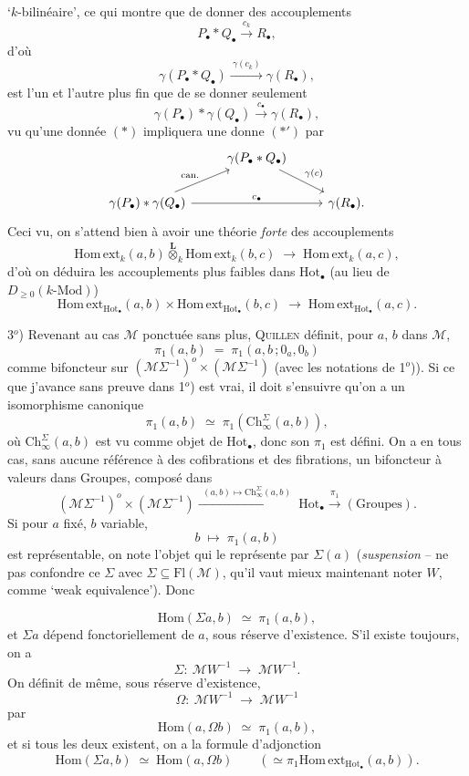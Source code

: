 \documentclass[11pt]{article}
\newcommand{\printedpage}[1]{\marginpar{\footnotesize p.~#1}}
\newcommand{\msp}[1]{\marginpar{\footnotesize [#1]}}
\newcommand{\Ch}{\mathrm{Ch}}
\newcommand{\Hot}{\mathrm{Hot}}
\newcommand{\M}{\mathcal{M}}
\newcommand{\Homext}{\mathrm{Hom\,ext}}
\newcommand{\Lotimes}{\overset{\mathbf{L}}{\otimes}}
\begin{document}
`$k$-bilinéaire', ce qui montre que de donner des accouplements
\[
P_{\bullet} * Q_{\bullet} \xrightarrow{\ c_k\ } R_{\bullet},
\]
d'où
\[
\gamma(P_{\bullet} * Q_{\bullet}) \xrightarrow{\ \gamma(c_k)\ } \gamma(R_{\bullet}), \tag*{$(*)$}
\]
est l'un et l'autre plus fin que de se donner seulement
\[
\gamma(P_{\bullet}) * \gamma(Q_{\bullet}) \xrightarrow{\ c_{\bullet}\ } \gamma(R_{\bullet}), \tag*{$(*')$}
\]
vu qu'une donnée $(*)$ impliquera une donne $(*')$ par %
\[
\begin{tikzcd}
 & \gamma(P_{\bullet} * Q_{\bullet}) \arrow[dr, "\gamma(c)"] & \\
\gamma(P_{\bullet}) * \gamma(Q_{\bullet}) \arrow[ur, "\text{can.}"] \arrow[rr, "c_{\bullet}"] & & \gamma(R_{\bullet}).
\end{tikzcd}
\]
Ceci vu, on s'attend bien à avoir une théorie \textit{forte} des accouplements
\printedpage{13}
\msp{page 21}
\[
\Homext_k(a,b) \Lotimes_k \Homext_k(b,c) \;\longrightarrow\; \Homext_k(a,c),
\]
d'où on déduira les accouplements plus faibles dans $\Hot_{\bullet}$ (au lieu de $D_{\geq 0}(k\text{-Mod})$)
\[
\Homext_{\Hot_{\bullet}}(a,b) \times \Homext_{\Hot_{\bullet}}(b,c) \;\longrightarrow\; \Homext_{\Hot_{\bullet}}(a,c).
\]

3$^o$) Revenant au cas $\M$ ponctuée sans plus, \textsc{Quillen} définit, pour $a$, $b$ dans $\M$,
\[
\pi_1(a,b) \;=\; \pi_1(a,b\,;0_a,0_b)
\]
comme bifoncteur sur $(\M\Sigma^{-1})^o\times(\M\Sigma^{-1})$ (avec les notations de 1$^o$)). Si ce que j'avance sans preuve dans 1$^o$) est vrai, il doit s'ensuivre qu'on a un isomorphisme canonique
\[
\pi_1(a,b) \;\simeq\; \pi_1(\Ch^{\Sigma}_{\infty}(a,b)),
\]
où $\Ch^{\Sigma}_{\infty}(a,b)$ est vu comme objet de $\Hot_{\bullet}$, donc son $\pi_1$ est défini. On a en tous cas, sans aucune référence à des cofibrations et des fibrations, un bifoncteur à valeurs dans Groupes, composé dans
\[
(\M\Sigma^{-1})^o\times(\M\Sigma^{-1}) \xrightarrow{\ \ (a,b)\longmapsto \Ch^{\Sigma}_{\infty}(a,b)\ \ } \Hot_{\bullet} \xrightarrow{\ \pi_1\ } (\text{Groupes}).
\]
Si pour $a$ fixé, $b$ variable,
\[
b \;\longmapsto\; \pi_1(a,b)
\]
est représentable, on note l'objet qui le représente par $\Sigma(a)$ (\textit{suspension} -- ne pas confondre ce $\Sigma$ avec $\Sigma \subseteq \mathrm{Fl}(\M)$, qu'il vaut mieux maintenant noter $W$, comme `weak equivalence'). Donc

\msp{page 22}

\[
\mathrm{Hom}(\Sigma a,b) \;\simeq\; \pi_1(a,b),
\]
et $\Sigma a$ dépend fonctoriellement de $a$, sous réserve d'existence. S'il existe toujours, on a
\[
\Sigma :\ \M W^{-1} \;\longrightarrow\; \M W^{-1}.
\]
On définit de même, sous réserve d'existence,
\[
\Omega :\ \M W^{-1} \;\longrightarrow\; \M W^{-1}
\]
par
\[
\mathrm{Hom}(a,\Omega b) \;\simeq\; \pi_1(a,b),
\]
et si tous les deux existent, on a la formule d'adjonction
\[
\mathrm{Hom}(\Sigma a,b) \;\simeq\; \mathrm{Hom}(a,\Omega b) \qquad (\simeq \pi_1\Homext_{\Hot_{\bullet}}(a,b)).
\]
\end{document}
